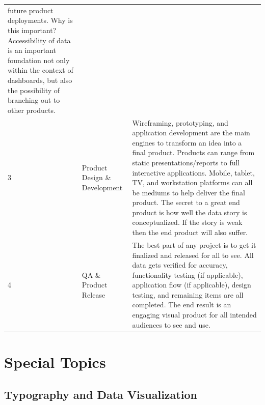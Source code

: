 \documentclass[]{book}
\theoremstyle{definition}
\theoremstyle{definition}
\theoremstyle{definition}
\theoremstyle{remark}
\begin{document}
\begin{longtable}[]{@{}lll@{}}
\begin{minipage}[t]{0.76\columnwidth}
future product deployments. Why is this important? Accessibility of data
is an important foundation not only within the context of dashboards,
but also the possibility of branching out to other products.\strut
\end{minipage}\tabularnewline
\begin{minipage}[t]{0.04\columnwidth}\raggedright\strut
3\strut
\end{minipage} & \begin{minipage}[t]{0.11\columnwidth}\raggedright\strut
Product Design \& Development\strut
\end{minipage} & \begin{minipage}[t]{0.76\columnwidth}\raggedright\strut
Wireframing, prototyping, and application development are the main
engines to transform an idea into a final product. Products can range
from static presentations/reports to full interactive applications.
Mobile, tablet, TV, and workstation platforms can all be mediums to help
deliver the final product. The secret to a great end product is how well
the data story is conceptualized. If the story is weak then the end
product will also suffer.\strut
\end{minipage}\tabularnewline
\begin{minipage}[t]{0.04\columnwidth}\raggedright\strut
4\strut
\end{minipage} & \begin{minipage}[t]{0.11\columnwidth}\raggedright\strut
QA \& Product Release\strut
\end{minipage} & \begin{minipage}[t]{0.76\columnwidth}\raggedright\strut
The best part of any project is to get it finalized and released for all
to see. All data gets verified for accuracy, functionality testing (if
applicable), application flow (if applicable), design testing, and
remaining items are all completed. The end result is an engaging visual
product for all intended audiences to see and use.\strut
\end{minipage}\tabularnewline
\bottomrule
\end{longtable}

\section{Special Topics}\label{special-topics-1}

\subsection{Typography and Data
Visualization}\label{typography-and-data-visualization}
\end{document}
